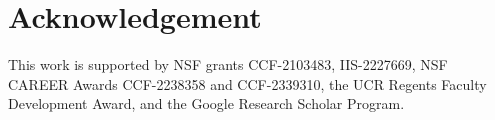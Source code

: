 \documentclass[sigconf,screen,pdfa]{acmart}
\begin{document}










\renewcommand\footnotetextcopyrightpermission[1]{} %
\fancyhead{} %


\setlength\abovedisplayskip{0.2em}
\setlength\belowdisplayskip{0.2em}
\setlength\abovedisplayshortskip{0.2em}
\setlength\belowdisplayshortskip{0.2em}



\maketitle







\section*{Acknowledgement}
This work is supported by NSF grants CCF-2103483, IIS-2227669, NSF CAREER Awards CCF-2238358 and CCF-2339310, the UCR Regents Faculty Development Award, and the Google Research Scholar Program.


\ifconference{\balance}


\iffullversion{
\appendix

}
\end{document}
